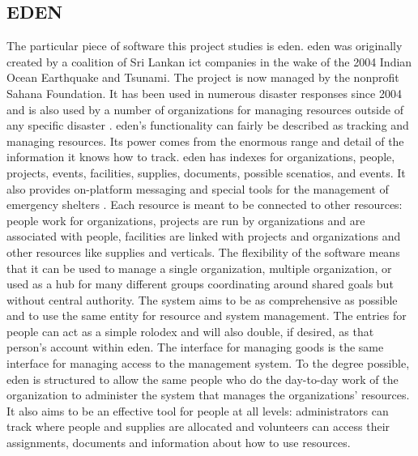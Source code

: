 \documentclass[a4paper,man,natbib]{apa6}
\begin{document}
  \subsection*{EDEN}
   The particular piece of software this project studies is \acrlong{eden}. \acrshort{eden} was originally created by a coalition of Sri Lankan \acrlong{ict} companies in the wake of the 2004 Indian Ocean Earthquake and Tsunami. The project is now managed by the nonprofit Sahana Foundation. It has been used in numerous disaster responses since 2004 and is also used by a number of organizations for managing resources outside of any specific disaster \citep{Sahana_Foundation_undated-hl}. \acrshort{eden}'s functionality can fairly be described as tracking and managing resources. Its power comes from the enormous range and detail of the information it knows how to track. \acrshort{eden} has indexes for organizations, people, projects, events, facilities, supplies, documents, possible scenatios, and events. It also provides on-platform messaging and special tools for the management of emergency shelters \citep{Sahana_Foundation2011-od}. Each resource is meant to be connected to other resources: people work for organizations, projects are run by organizations and are associated with people, facilities are linked with projects and organizations and other resources like supplies and verticals. The flexibility of the software means that it can be used to manage a single organization, multiple organization, or used as a hub for many different groups coordinating around shared goals but without central authority. The system aims to be as comprehensive as possible and to use the same entity for resource and system management. The entries for people can act as a simple rolodex and will also double, if desired, as that person's account within \acrshort{eden}. The interface for managing goods is the same interface for managing access to the management system. To the degree possible, \acrshort{eden} is structured to allow the same people who do the day-to-day work of the organization to administer the system that manages the organizations' resources. It also aims to be an effective tool for people at all levels: administrators can track where people and supplies are allocated and volunteers can access their assignments, documents and information about how to use resources.
\end{document}
